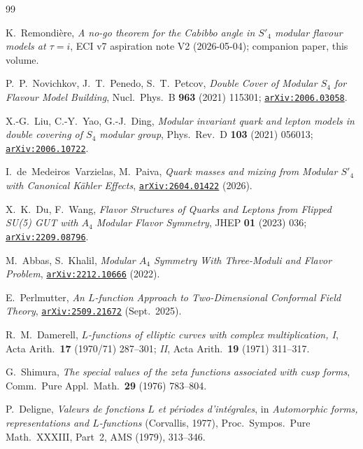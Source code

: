 \documentclass[a4paper,11pt]{article}
\newcommand{\arXiv}[1]{\href{https://arxiv.org/abs/#1}{\texttt{arXiv:#1}}}
\theoremstyle{definition}
\theoremstyle{remark}
\begin{document}
\begin{thebibliography}{99}

K.~Remondi\`ere,
\emph{A no-go theorem for the Cabibbo angle in $S'_4$ modular
flavour models at $\tau=i$},
ECI v7 aspiration note V2 (2026-05-04);
companion paper, this volume.

P.~P.~Novichkov, J.~T.~Penedo, S.~T.~Petcov,
\emph{Double Cover of Modular $S_4$ for Flavour Model Building},
Nucl.~Phys.~B \textbf{963} (2021) 115301;
\arXiv{2006.03058}.

X.-G.~Liu, C.-Y.~Yao, G.-J.~Ding,
\emph{Modular invariant quark and lepton models in double covering of
$S_4$ modular group},
Phys.~Rev.~D \textbf{103} (2021) 056013;
\arXiv{2006.10722}.

I.~de~Medeiros~Varzielas, M.~Paiva,
\emph{Quark masses and mixing from Modular $S'_4$ with Canonical
K\"ahler Effects}, \arXiv{2604.01422} (2026).

X.~K.~Du, F.~Wang,
\emph{Flavor Structures of Quarks and Leptons from Flipped SU(5) GUT
with $A_4$ Modular Flavor Symmetry},
JHEP \textbf{01} (2023) 036;
\arXiv{2209.08796}.

M.~Abbas, S.~Khalil,
\emph{Modular $A_4$ Symmetry With Three-Moduli and Flavor Problem},
\arXiv{2212.10666} (2022).

E.~Perlmutter,
\emph{An $L$-function Approach to Two-Dimensional Conformal Field Theory},
\arXiv{2509.21672} (Sept.~2025).

R.~M.~Damerell,
\emph{$L$-functions of elliptic curves with complex multiplication, I},
Acta Arith.\ \textbf{17} (1970/71) 287--301;
\emph{II}, Acta Arith.\ \textbf{19} (1971) 311--317.

G.~Shimura,
\emph{The special values of the zeta functions associated with cusp forms},
Comm.~Pure Appl.~Math.\ \textbf{29} (1976) 783--804.

P.~Deligne,
\emph{Valeurs de fonctions $L$ et p\'eriodes d'int\'egrales},
in \emph{Automorphic forms, representations and $L$-functions} (Corvallis, 1977),
Proc.\ Sympos.\ Pure Math.\ XXXIII, Part~2, AMS (1979), 313--346.


\end{thebibliography}
\end{document}
